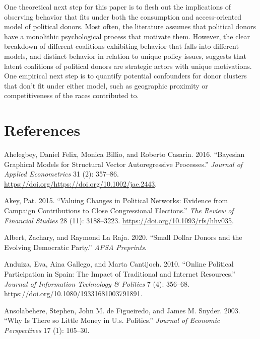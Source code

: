 \documentclass[12pt,]{article}
\begin{document}
One theoretical next step for this paper is to flesh out the
implications of observing behavior that fits under both the consumption
and access-oriented model of political donors. Most often, the
literature assumes that political donors have a monolithic psychological
process that motivate them. However, the clear breakdown of different
coalitions exhibiting behavior that falls into different models, and
distinct behavior in relation to unique policy issues, suggests that
latent coalitions of political donors are strategic actors with unique
motivations. One empirical next step is to quantify potential
confounders for donor clusters that don't fit under either model, such
as geographic proximity or competitiveness of the races contributed to.

\hypertarget{references}{%
\section*{References}\label{references}}

\hypertarget{refs}{}
\leavevmode\hypertarget{ref-bic}{}%
Ahelegbey, Daniel Felix, Monica Billio, and Roberto Casarin. 2016.
``Bayesian Graphical Models for Structural Vector Autoregressive
Processes.'' \emph{Journal of Applied Econometrics} 31 (2): 357--86.
\url{https://doi.org/https://doi.org/10.1002/jae.2443}.

\leavevmode\hypertarget{ref-akey2015}{}%
Akey, Pat. 2015. ``Valuing Changes in Political Networks: Evidence from
Campaign Contributions to Close Congressional Elections.'' \emph{The
Review of Financial Studies} 28 (11): 3188--3223.
\url{https://doi.org/10.1093/rfs/hhv035}.

\leavevmode\hypertarget{ref-albert2020}{}%
Albert, Zachary, and Raymond La Raja. 2020. ``Small Dollar Donors and
the Evolving Democratic Party.'' \emph{APSA Preprints}.

\leavevmode\hypertarget{ref-anduiza2010}{}%
Anduiza, Eva, Aina Gallego, and Marta Cantijoch. 2010. ``Online
Political Participation in Spain: The Impact of Traditional and Internet
Resources.'' \emph{Journal of Information Technology \& Politics} 7 (4):
356--68. \url{https://doi.org/10.1080/19331681003791891}.

\leavevmode\hypertarget{ref-ansolabehere2003}{}%
Ansolabehere, Stephen, John M. de Figueiredo, and James M. Snyder. 2003.
``Why Is There so Little Money in U.s. Politics.'' \emph{Journal of
Economic Perspectives} 17 (1): 105--30.
\end{document}
